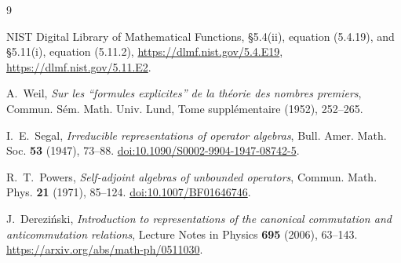 \documentclass[11pt]{article}
\theoremstyle{definition}
\theoremstyle{remark}
\numberwithin{equation}{section}
\begin{document}
\begin{thebibliography}{9}

NIST Digital Library of Mathematical Functions,
\S5.4(ii), equation (5.4.19), and \S5.11(i), equation (5.11.2),
\url{https://dlmf.nist.gov/5.4.E19},
\url{https://dlmf.nist.gov/5.11.E2}.

A.~Weil,
\emph{Sur les ``formules explicites'' de la th\'eorie des nombres premiers},
Commun. S\'em. Math. Univ. Lund, Tome suppl\'ementaire (1952), 252--265.

I.~E.~Segal,
\emph{Irreducible representations of operator algebras},
Bull. Amer. Math. Soc. \textbf{53} (1947), 73--88.
\href{https://doi.org/10.1090/S0002-9904-1947-08742-5}
{doi:10.1090/S0002-9904-1947-08742-5}.

R.~T.~Powers,
\emph{Self-adjoint algebras of unbounded operators},
Commun. Math. Phys. \textbf{21} (1971), 85--124.
\href{https://doi.org/10.1007/BF01646746}
{doi:10.1007/BF01646746}.

J.~Derezi\'nski,
\emph{Introduction to representations of the canonical commutation and
anticommutation relations},
Lecture Notes in Physics \textbf{695} (2006), 63--143.
\url{https://arxiv.org/abs/math-ph/0511030}.

\end{thebibliography}
\end{document}
